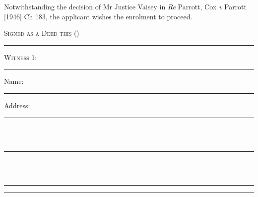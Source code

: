 \documentclass[10pt, twoside, a4paper]{article}
\begin{document}
\vspace{10pt}

\noindent Notwithstanding the decision of Mr Justice Vaisey in \textit{Re} Parrott, Cox
\textit{v} Parrott [1946] Ch 183, the applicant wishes the enrolment to proceed.

\vspace{2pt}

{
	\scshape
	\noindent Signed as a Deed this \worddate  \space (\numberdate)
}

\vspace{48pt}

\begin{multicols}{2}

	\par\noindent\hrule
	\vspace{14pt}

	{
		\centering
		\noindent
		\textbf{\scshape{\newname}}
		\par
	}

	\vspace{48pt}

	{\scshape \noindent Witness 1:}

	\vspace{48pt}
	\par\noindent\hrule
	\vspace{14pt}

	{
		\scshape

		\noindent Name: \\
		\noindent\hspace*{4em}\rule{0.35\textwidth}{0.5pt}

		\vspace{12pt}

		\noindent Address:

		\noindent\hspace*{4em}\rule{0.35\textwidth}{0.5pt} \\ \\
		\noindent\hspace*{4em}\rule{0.35\textwidth}{0.5pt} \\ \\
		\noindent\hspace*{4em}\rule{0.35\textwidth}{0.5pt}
	}

	\columnbreak

	\par\noindent\hrule
	\vspace{14pt}

	{
		\centering
		\noindent
        \textbf{\scshape{\oldname}}
		\par
	}


\end{multicols}
\end{document}
